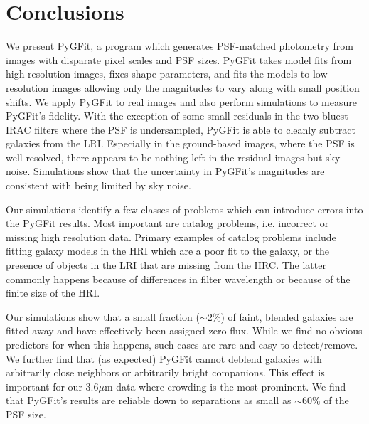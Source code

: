 \documentclass[apj]{emulateapj}
\newcommand{\sersic}{S\'{e}rsic}
\newcommand{\pygfit}{PyGFit}
\begin{document}

\section{Conclusions}\label{sec:conclusions}

We present \pygfit{}, a program which generates PSF-matched photometry from images with disparate pixel scales and PSF sizes.  \pygfit{} takes model fits from high resolution images, fixes shape parameters, and fits the models to low resolution images allowing only the magnitudes to vary along with small position shifts.  We apply \pygfit{} to real images and also perform simulations to measure \pygfit{}'s fidelity.  With the exception of some small residuals in the two bluest IRAC filters where the PSF is undersampled, \pygfit{} is able to cleanly subtract galaxies from the LRI.  Especially in the ground-based images, where the PSF is well resolved, there appears to be nothing left in the residual images but sky noise.  Simulations show that the uncertainty in \pygfit{}'s magnitudes are consistent with being limited by sky noise.

Our simulations identify a few classes of problems which can introduce errors into the \pygfit{} results.  Most important are catalog problems, i.e. incorrect or missing high resolution data.  Primary examples of catalog problems include fitting galaxy models in the HRI which are a poor fit to the galaxy, or the presence of objects in the LRI that are missing from the HRC.  The latter commonly happens because of differences in filter wavelength or because of the finite size of the HRI.

Our simulations show that a small fraction ($\sim2\%$) of faint, blended galaxies are fitted away and have effectively been assigned zero flux.  While we find no obvious predictors for when this happens, such cases are rare and easy to detect/remove.  We further find that (as expected) \pygfit{} cannot deblend galaxies with arbitrarily close neighbors or arbitrarily bright companions.  This effect is important for our $3.6\mu$m data where crowding is the most prominent.  We find that \pygfit{}'s results are reliable down to separations as small as $\sim60\%$ of the PSF size.



\end{document}

